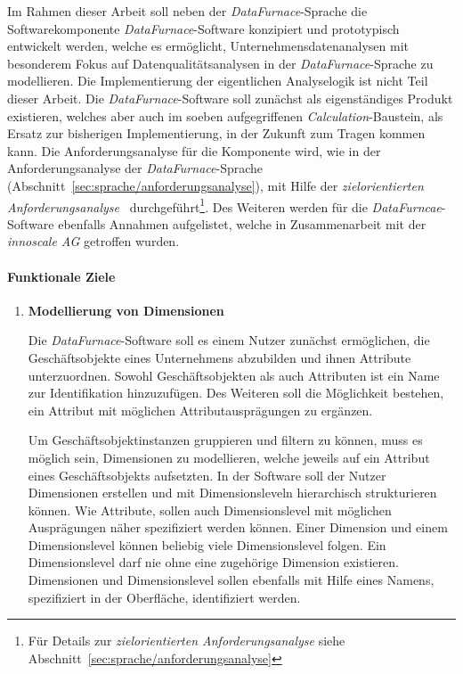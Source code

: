 \documentclass[
  language=german, %
  type=bachelor,%
  ngerman
]{isthesis}
\begin{document}
\begin{content}
  Im Rahmen dieser Arbeit soll neben der \textit{DataFurnace}-Sprache die
  Softwarekomponente \textit{DataFurnace}-Software konzipiert und prototypisch
  entwickelt werden, welche es ermöglicht, Unternehmensdatenanalysen mit
  besonderem Fokus auf Datenqualitätsanalysen in der
  \textit{DataFurnace}-Sprache zu modellieren. Die Implementierung der
  eigentlichen Analyselogik ist nicht Teil dieser Arbeit.  Die
  \textit{DataFurnace}-Software soll zunächst als eigenständiges Produkt
  existieren, welches aber auch im soeben aufgegriffenen
  \textit{Calculation}-Baustein, als Ersatz zur bisherigen Implementierung, in
  der Zukunft zum Tragen kommen kann. Die Anforderungsanalyse für die
  Komponente wird, wie in der Anforderungsanalyse der
  \textit{DataFurnace}-Sprache
  (Abschnitt~\ref{sec:sprache/anforderungsanalyse}), mit Hilfe der
  \textit{zielorientierten Anforderungsanalyse}~\cite[][]{van2001goal}
  durchgeführt\footnote{Für Details zur \textit{zielorientierten
  Anforderungsanalyse} siehe Abschnitt~\ref{sec:sprache/anforderungsanalyse}}.
  Des Weiteren werden für die \textit{DataFurncae}-Software ebenfalls Annahmen
  aufgelistet, welche in Zusammenarbeit mit der \textit{innoscale AG} getroffen
  wurden.



  \paragraph{Funktionale Ziele}
  \begin{enumerate}
    \item \textbf{Modellierung von Dimensionen}

      Die \textit{DataFurnace}-Software soll es einem Nutzer zunächst
      ermöglichen, die Geschäftsobjekte eines Unternehmens abzubilden und ihnen
      Attribute unterzuordnen. Sowohl Geschäftsobjekten als auch Attributen
      ist ein Name zur Identifikation hinzuzufügen. Des Weiteren soll die
      Möglichkeit bestehen, ein Attribut mit möglichen Attributausprägungen zu
      ergänzen.

      Um Geschäftsobjektinstanzen gruppieren und filtern zu können, muss es
      möglich sein, Dimensionen zu modellieren, welche jeweils auf ein Attribut
      eines Geschäftsobjekts aufsetzten. In der Software soll der Nutzer
      Dimensionen erstellen und mit Dimensionsleveln hierarchisch strukturieren
      können. Wie Attribute, sollen auch Dimensionslevel mit möglichen
      Ausprägungen näher spezifiziert werden können. Einer Dimension und einem
      Dimensionslevel können beliebig viele Dimensionslevel folgen. Ein
      Dimensionslevel darf nie ohne eine zugehörige Dimension existieren.
      Dimensionen und Dimensionslevel sollen ebenfalls mit Hilfe eines Namens,
      spezifiziert in der Oberfläche, identifiziert werden.


\end{enumerate}
\end{content}
\end{document}
